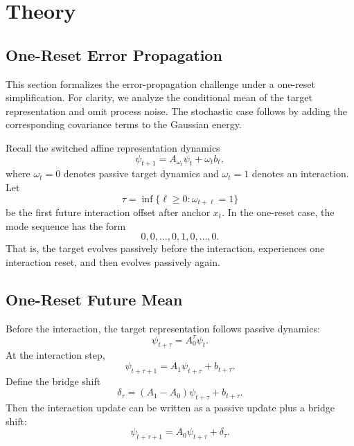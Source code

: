 \section{Theory}
\label{app:theory}

\subsection{One-Reset Error Propagation}
\label{app:one-reset-error}

This section formalizes the error-propagation challenge under a one-reset simplification. For clarity, we analyze the conditional mean of the target representation and omit process noise. The stochastic case follows by adding the corresponding covariance terms to the Gaussian energy.

Recall the switched affine representation dynamics
\begin{equation}
    \psi_{t+1}
    =
    A_{\omega_t}\psi_t
    +
    \omega_t b_t,
\end{equation}
where $\omega_t=0$ denotes passive target dynamics and $\omega_t=1$ denotes an interaction. Let
\begin{equation}
    \tau
    =
    \inf\{\ell\ge 0:\omega_{t+\ell}=1\}
\end{equation}
be the first future interaction offset after anchor $x_t$. In the one-reset case, the mode sequence has the form
\[
    0,0,\ldots,0,1,0,\ldots,0.
\]
That is, the target evolves passively before the interaction, experiences one interaction reset, and then evolves passively again.

\subsection{One-Reset Future Mean}

Before the interaction, the target representation follows passive dynamics:
\begin{equation}
    \psi_{t+\tau}
    =
    A_0^\tau \psi_t .
\end{equation}
At the interaction step,
\begin{equation}
    \psi_{t+\tau+1}
    =
    A_1\psi_{t+\tau}
    +
    b_{t+\tau}.
\end{equation}
Define the bridge shift
\begin{equation}
    \delta_{\tau}
    =
    (A_1-A_0)\psi_{t+\tau}
    +
    b_{t+\tau}.
    \label{eq:bridge-shift-appendix}
\end{equation}
Then the interaction update can be written as a passive update plus a bridge shift:
\begin{equation}
    \psi_{t+\tau+1}
    =
    A_0\psi_{t+\tau}
    +
    \delta_{\tau}.
\end{equation}

